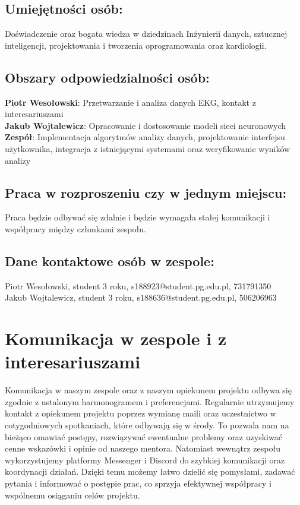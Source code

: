 \documentclass[12pt]{article}
\begin{document}
        \subsection*{Umiejętności osób:}
            Doświadczenie oraz bogata wiedza w dziedzinach Inżynierii danych, sztucznej inteligencji, projektowania i tworzenia oprogramowania oraz kardiologii. 

        \subsection*{Obszary odpowiedzialności osób:}
            \textbf{Piotr Wesołowski}: Przetwarzanie i analiza danych EKG, kontakt z interesariuszami \\
            \textbf{Jakub Wojtalewicz}: Opracowanie i dostosowanie modeli sieci neuronowych \\
            \textbf{Zespół}: Implementacja algorytmów analizy danych, projektowanie interfejsu użytkownika, integracja z istniejącymi systemami oraz weryfikowanie wyników analizy 

        \subsection*{Praca w rozproszeniu czy w jednym miejscu:}  
            Praca będzie odbywać się zdalnie i będzie wymagała stałej komunikacji i współpracy między członkami zespołu. 

        \subsection*{Dane kontaktowe osób w zespole:}
            Piotr Wesołowski, student 3 roku, s188923@student.pg.edu.pl, 731791350 \\
            Jakub Wojtalewicz, student 3 roku, s188636@student.pg.edu.pl, 506206963 

    \section{Komunikacja w zespole i z interesariuszami}

        Komunikacja w naszym zespole oraz z naszym opiekunem projektu odbywa się zgodnie z ustalonym harmonogramem i preferencjami. Regularnie utrzymujemy kontakt z opiekunem projektu poprzez wymianę maili oraz uczestnictwo w cotygodniowych spotkaniach, które odbywają się w środy. To pozwala nam na bieżąco omawiać postępy, rozwiązywać ewentualne problemy oraz uzyskiwać cenne wskazówki i opinie od naszego mentora. Natomiast wewnątrz zespołu wykorzystujemy platformy Messenger i Discord do szybkiej komunikacji oraz koordynacji działań. Dzięki temu możemy łatwo dzielić się pomysłami, zadawać pytania i informować o postępie prac, co sprzyja efektywnej współpracy i wspólnemu osiąganiu celów projektu. 
\end{document}
